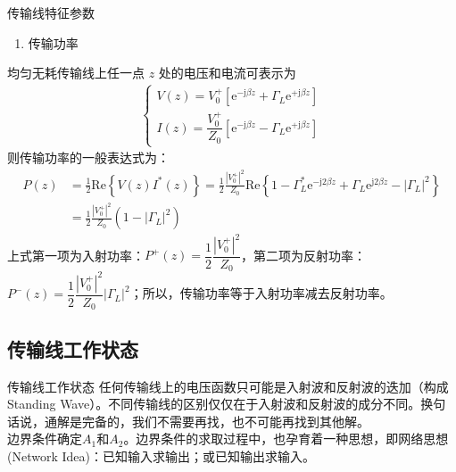 \begin{frame}{传输线特征参数}
  \begin{enumerate}
    \resume
    \item 传输功率
  \end{enumerate}
  均匀无耗传输线上任一点 $z$ 处的电压和电流可表示为
  \begin{align*}
    \begin{cases}
      V(z)=V_0^+\left[\mathrm{e}^{-\mathrm{j}\beta z}+\Gamma_L\mathrm{e}^{+\mathrm{j}\beta z} \right] \\
      I(z)=\dfrac{V_0^+}{Z_0}\left[ \mathrm{e}^{-\mathrm{j}\beta z}-\Gamma_L\mathrm{e}^{+\mathrm{j}\beta z}\right]
    \end{cases}
  \end{align*}
  则传输功率的一般表达式为：
  \begin{align*}
    P(z) & =\frac{1}{2}\mathrm{Re}\left\{V(z)I^*(z)\right\}=\frac{1}{2}\frac{|V_0^+|^2}{Z_0}\mathrm{Re}\left\{1-\Gamma_L^*\mathrm{e}^{-\mathrm{j}2\beta z}+\Gamma_L\mathrm{e}^{\mathrm{j}2\beta z}-|\Gamma_L|^2\right\} \\
         & =\frac{1}{2}\frac{|V_0^+|^2}{Z_0}(1-|\Gamma_L|^2)
  \end{align*}
  上式第一项为入射功率：$P^+(z)=\dfrac{1}{2}\dfrac{|V_0^+|^2}{Z_0}$，第二项为反射功率：$P^-(z)=\dfrac{1}{2}\dfrac{|V_0^+|^2}{Z_0}|\Gamma_L|^2$；所以，传输功率等于入射功率减去反射功率。
\end{frame}

\subsection{传输线工作状态}
\begin{frame}{传输线工作状态}
  任何传输线上的电压函数只可能是入射波和反射波的迭加（构成Standing Wave）。不同传输线的区别仅仅在于入射波和反射波的成分不同。换句话说，通解是完备的，我们不需要再找，也不可能再找到其他解。\\
  边界条件确定$A_{1}$和$A_{2}$。边界条件的求取过程中，也孕育着一种思想，即网络思想(Network Idea)：已知输入求输出；或已知输出求输入。
\end{frame}

